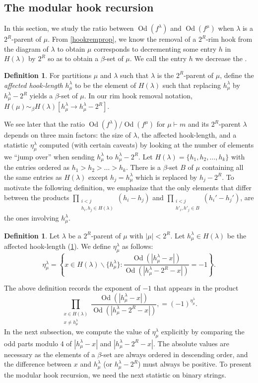 \documentclass[12pt]{amsart}
\theoremstyle{definition}
\newtheorem{definition}[theorem]{Definition}
\numberwithin{equation}{section}
\newcommand{\la}{\lambda}
\newcommand{\workhorse}{modular hook recursion}
\DeclareMathOperator{\Od}{Od}
\begin{document}
\subsection{The \workhorse}
In this section, we study the ratio between $\Od(f^\la)$ and $\Od(f^\mu)$ when $\la$ is a $2^R$-parent of $\mu$. From \cref{hookremprop}, we know the removal of a $2^R$-rim hook from the diagram of $\la$ to obtain $\mu$ corresponds to decrementing some entry $h$ in $H(\la)$ by $2^R$ so as to obtain a $\beta$-set of $\mu$. We call the entry $h$ we decrease the .
\begin{definition}\label{notn:aff}
For partitions $\mu$ and $\la$ such that $\la$ is the $2^R$-parent of $\mu$, define the \textit{affected hook-length} $h^\la_\mu$ to be the element of $H(\la)$ such that replacing $h^\la_\mu$ by $h^\la_\mu - 2^R$ yields a $\beta$-set of $\mu$. In our rim hook removal notation, $H(\mu) \sim_\beta H(\la)[h^\la_\mu \to h^\la_\mu - 2^R]$.
\end{definition}
We see later that the ratio $\Od(f^\lambda)/\Od(f^\mu)$ for $\mu\vdash m$ and its $2^R$-parent $\lambda$ depends on three main factors: the size of $\la$, the affected hook-length, and a statistic $\eta^\lambda_\mu$ computed (with certain caveats) by looking at the number of elements we ``jump over'' when sending $h^\la_\mu$ to $h^\la_\mu-2^R$. Let $H(\la) = \{h_1, h_2, \ldots, h_k\}$ with the entries ordered as $h_1 > h_2 > \ldots > h_k$. There is a $\beta$-set $B$ of $\mu$ containing all the same entries as $H(\la)$ except $h_j = h^\la_\mu$ which is replaced by $h_j - 2^R$.
To motivate the following definition, we emphasize that the only elements that differ between the products $\prod\limits_{\substack{i < j\\ h_i, h_j \in H(\la)}} (h_i - h_j)$ and $\prod\limits_{\substack{i < j\\ h'_i, h'_j \in B}} (h_i' - h_j')$, are the ones involving $h^\la_\mu$.
\begin{definition}\label{defn:inversions}
Let $\lambda$ be a $2^R$-parent of $\mu$ with $|\mu| < 2^R$. Let $h^\lambda_\mu \in H(\lambda)$ be the affected hook-length (\cref{notn:aff}). We define $\eta^\lambda_\mu$ as follows:
\[
\eta^\la_\mu = \left\{x\in H(\la)\backslash \{h^\la_\mu\} :  \dfrac{\Od(|h^\lambda_\mu- x|)}{\Od(|h^\lambda_\mu - 2^R - x|)} = -1\right\}.
\]
\end{definition}
The above definition records the exponent of $-1$ that appears in the product \[ \prod\limits_{\substack{x \in H(\lambda)\\ x \neq h^\lambda_\mu}} \dfrac{\Od(|h^\lambda_\mu- x|)}{\Od(|h^\lambda_\mu - 2^R - x|)},
 = (-1)^{\eta^\la_\mu}.\] In the next subsection, we compute the value of $\eta^\la_\mu$ explicitly by comparing the odd parts modulo 4 of $|h^\la_\mu - x|$ and $|h^\la_\mu - 2^R - x|$. The absolute values are necessary as the elements of a $\beta$-set are always ordered in descending order, and the difference between $x$ and $h^\la_\mu$ (or $h^\la_\mu - 2^R$) must always be positive. To present the \workhorse, we need the next statistic on binary strings.
\end{document}
